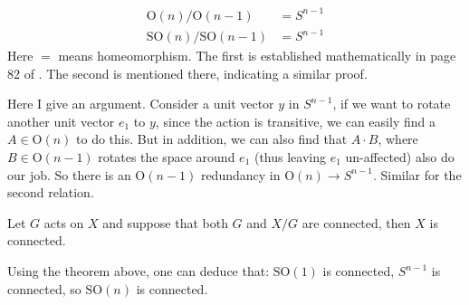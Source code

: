 \documentclass{article}
\begin{document}
\begin{ex}
\begin{align}
    \mathrm{O}(n)/\mathrm{O}(n-1) &= S^{n-1} \\
    \mathrm{SO}(n)/\mathrm{SO}(n-1) &= S^{n-1}
\end{align}
    Here $=$ means homeomorphism. The first is established
    mathematically in page 82 of \cite{book}. The second is mentioned
    there, indicating a similar proof.

    Here I give an argument. Consider a unit vector $y$ in $S^{n-1}$, if
    we want to rotate another unit vector $e_1$ to $y$, since the
    action is transitive, we can easily find a $A\in \mathrm{O}(n)$ to
    do this. But in addition, we can also find that $A\cdot B$, where
    $B\in \mathrm{O}(n-1)$ rotates the space around $e_1$ (thus
    leaving $e_1$ un-affected) also do our job. So there is an
    $\mathrm{O}(n-1)$ redundancy in $\mathrm{O}(n)\to S^{n-1}$.
    Similar for the second relation.
\end{ex}

\begin{thm}
    Let $G$ acts on $X$ and suppose that both $G$ and $X/G$ are
    connected, then $X$ is connected.
\end{thm}
\begin{fact}
    Using the theorem above, one can deduce that: $\mathrm{SO}(1)$ is
    connected, $S^{n-1}$ is connected, so $\mathrm{SO}(n)$ is
    connected.
\end{fact}
\end{document}
